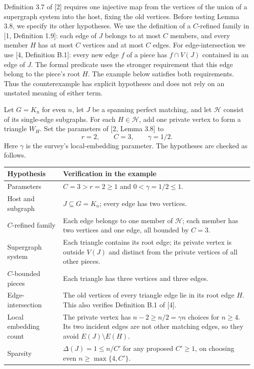 \documentclass[english,11pt,a4paper]{article}
\begin{document}
Definition 3.7 of {[}2{]} requires one injective map from the vertices of the union of a supergraph system into the host, fixing the old vertices. Before testing Lemma 3.8, we specify its other hypotheses. We use the definition of a \(C\)-refined family in {[}1, Definition 1.9{]}: each edge of \(J\) belongs to at most \(C\) members, and every member \(H\) has at most \(C\) vertices and at most \(C\) edges. For edge-intersection we use {[}4, Definition B.1{]}: every new edge \(f\) of a piece has \(f\cap V(J)\) contained in an edge of \(J\). The formal predicate uses the stronger requirement that this edge belong to the piece's root \(H\). The example below satisfies both requirements. Thus the counterexample has explicit hypotheses and does not rely on an unstated meaning of either term.

Let \(G=K_n\) for even \(n\), let \(J\) be a spanning perfect matching, and let \(\mathcal H\) consist of its single-edge subgraphs. For each \(H\in\mathcal H\), add one private vertex to form a triangle \(W_H\). Set the parameters of {[}2, Lemma 3.8{]} to \[r=2,\qquad C=3,\qquad \gamma=1/2.
\tag{4.1}\] Here \(\gamma\) is the survey's local-embedding parameter. The hypotheses are checked as follows.

{\begin{longtable}[]{@{}
  >{\raggedright\arraybackslash}p{}
  >{\raggedright\arraybackslash}p{}@{}}
\toprule\noalign{}
\begin{minipage}[b]{\linewidth}\raggedright
Hypothesis
\end{minipage} & \begin{minipage}[b]{\linewidth}\raggedright
Verification in the example
\end{minipage} \\
\midrule\noalign{}
\endhead
\bottomrule\noalign{}
\endlastfoot
Parameters & \(C=3>r=2\ge1\) and \(0<\gamma=1/2\le1\). \\
Host and subgraph & \(J\subseteq G=K_n\); every edge has two vertices. \\
\(C\)-refined family & Each edge belongs to one member of \(\mathcal H\); each member has two vertices and one edge, all bounded by \(C=3\). \\
Supergraph system & Each triangle contains its root edge; its private vertex is outside \(V(J)\) and distinct from the private vertices of all other pieces. \\
\(C\)-bounded pieces & Each triangle has three vertices and three edges. \\
Edge-intersection & The old vertices of every triangle edge lie in its root edge \(H\). This also verifies Definition B.1 of {[}4{]}. \\
Local embedding count & The private vertex has \(n-2\ge n/2=\gamma n\) choices for \(n\ge4\). Its two incident edges are not other matching edges, so they avoid \(E(J)\setminus E(H)\). \\
Sparsity & \(\Delta(J)=1\le n/C'\) for any proposed \(C'\ge1\), on choosing even \(n\ge\max\{4,C'\}\). \\
\end{longtable}
}
\end{document}
